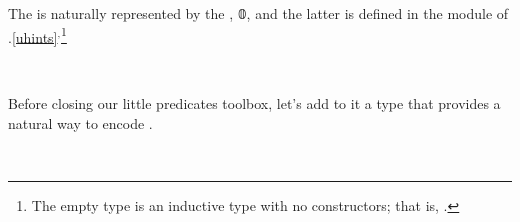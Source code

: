 \ccpad
The  is naturally represented by the , \af 𝟘, and the latter is defined in the  module of \typtop.\cref{uhints}$^, $\footnote{%
The empty type is an inductive type with no constructors; that is, \AgdaSpace{}%
\AgdaSpace{}%
\AgdaSymbol{\{}\AgdaSymbol{\}}\AgdaSpace{}%
\AgdaSymbol{:}\AgdaSpace{}%
\AgdaSpace{}%
\AgdaSpace{}%
\AgdaSpace{}%
.}
\ccpad
\begin{code}
\>[0]\AgdaSpace{}%
\AgdaSymbol{:}\AgdaSpace{}%
\AgdaSpace{}%
\AgdaSpace{}%
\<%
\\
\>[0]\AgdaSpace{}%
\AgdaSymbol{\AgdaUnderscore{}}\AgdaSpace{}%
\AgdaSymbol{=}\AgdaSpace{}%
\<%
\end{code}
\ccpad
Before closing our little predicates toolbox, let's add to it a type that provides a natural way to encode .
\ccpad
\begin{code}
\>[0]\AgdaSpace{}%
\AgdaSymbol{:}\AgdaSpace{}%
\AgdaSpace{}%
\AgdaSpace{}%
\AgdaSpace{}%
\AgdaSpace{}%
\AgdaSymbol{\AgdaUnderscore{}}\<%
\\
\>[0]\AgdaSpace{}%
\AgdaSpace{}%
\AgdaSpace{}%
\AgdaSymbol{=}\AgdaSpace{}%
\AgdaSpace{}%
\<%
\end{code}





